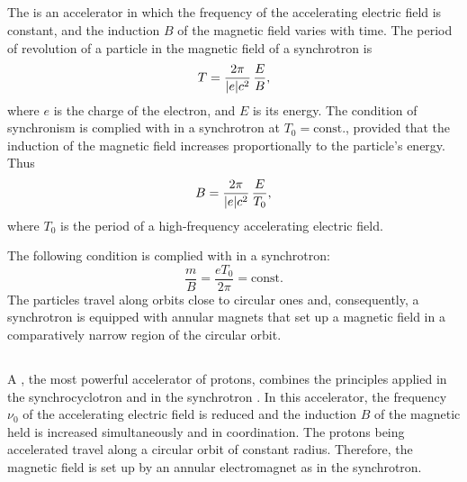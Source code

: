 \subsection{}\label{24.4.9} The  is an accelerator in which the frequency of the accelerating electric field is constant, and the induction $B$ of the magnetic field varies with time. The period of revolution of a particle in the magnetic field of a synchrotron  is
\begin{equation*}%
T = \frac{2\pi}{\abs{e}c^{2}} \, \frac{E}{B},
\end{equation*}
where $e$ is the charge of the electron, and $E$ is its energy. The condition of synchronism  is complied with in a synchrotron at $T_{0} = \text{const.}$, provided that the induction of the magnetic field increases proportionally to the particle's energy. Thus
\begin{equation*}%
B = \frac{2\pi}{\abs{e}c^{2}} \, \frac{E}{T_{0}},
\end{equation*}
where $T_{0}$ is the period of a high-frequency accelerating electric field.

The following condition is complied with in a synchrotron:
\begin{equation*}%
\frac{m}{B} = \frac{eT_{0}}{2 \pi} = \text{const.}
\end{equation*}
The particles travel along orbits close to circular ones  and, consequently, a synchrotron is equipped with annular magnets that set up a magnetic field in a comparatively narrow region of the circular orbit.

\subsection{}\label{24.4.10} A , the most powerful accelerator of protons, combines the principles applied in the synchrocyclotron  and in the synchrotron . In this accelerator, the frequency $\nu_{0}$ of the accelerating electric field is reduced and the induction $B$ of the magnetic held is increased simultaneously and in coordination. The protons being accelerated travel along a circular orbit of constant radius. Therefore, the magnetic field is set up by an annular electromagnet as in the synchrotron.

